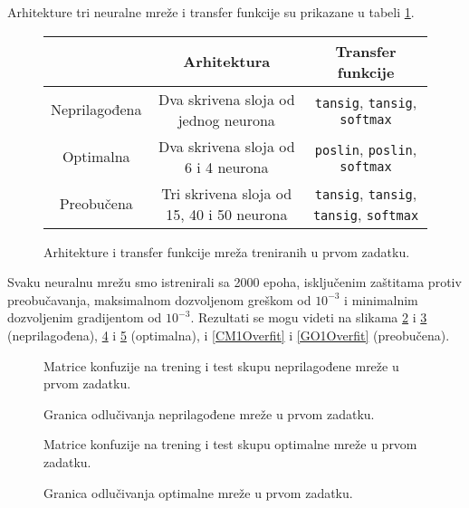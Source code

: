 \documentclass[10pt,a4paper,titlepage,croatian]{article}
\begin{document}
Arhitekture tri neuralne mreže i transfer funkcije su prikazane u tabeli \ref{Arhitektura1}.
\begin{figure}[H]
    \begin{tabular}{ |c|c|c| }
        \hline
        & Arhitektura & Transfer funkcije \\
        \hline
        Neprilagođena & Dva skrivena sloja od jednog neurona & \texttt{tansig}, \texttt{tansig}, \texttt{softmax} \\
        \hline
        Optimalna     & Dva skrivena sloja od 6 i 4 neurona  & \texttt{poslin}, \texttt{poslin}, \texttt{softmax} \\
        \hline
        Preobučena    & Tri skrivena sloja od 15, 40 i 50 neurona & \texttt{tansig}, \texttt{tansig}, \texttt{tansig}, \texttt{softmax} \\
        \hline
    \end{tabular}
    \caption{Arhitekture i transfer funkcije mreža treniranih u prvom zadatku.}
    \label{Arhitektura1}
\end{figure}
Svaku neuralnu mrežu smo istrenirali sa 2000 epoha, isključenim zaštitama protiv preobučavanja, maksimalnom dozvoljenom greškom od $10^{-3}$ i minimalnim dozvoljenim gradijentom od $10^{-3}$. Rezultati se mogu videti na slikama \ref{CM1Underfit} i \ref{GO1Underfit} (neprilagođena), \ref{CM1Optimal} i \ref{GO1Optimal} (optimalna), i \ref{CM1Overfit} i \ref{GO1Overfit} (preobučena).
\begin{figure}[H]
    \centering
    
    
    \caption{Matrice konfuzije na trening i test skupu neprilagođene mreže u prvom zadatku.}
    \label{CM1Underfit}
\end{figure}
\begin{figure}[H]
    \centering
    
    \caption{Granica odlučivanja neprilagođene mreže u prvom zadatku.}
    \label{GO1Underfit}
\end{figure}
\begin{figure}[H]
    \centering
    
    
    \caption{Matrice konfuzije na trening i test skupu optimalne mreže u prvom zadatku.}
    \label{CM1Optimal}
\end{figure}
\begin{figure}[H]
    \centering
    
    \caption{Granica odlučivanja optimalne mreže u prvom zadatku.}
    \label{GO1Optimal}
\end{figure}
\end{document}
